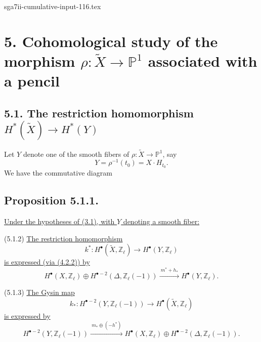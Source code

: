 \begin{filecontents*}{sga7ii-cumulative-input-116.tex}
\section*{5. Cohomological study of the morphism
$\rho:\widetilde X\longrightarrow\mathbb P^1$ associated with a pencil}

\subsection*{5.1. The restriction homomorphism
$H^*(\widetilde X)\longrightarrow H^*(Y)$}

Let $Y$ denote one of the smooth fibers of
$\rho:\widetilde X\to\mathbb P^1$, say
\[
Y=\rho^{-1}(t_0)=X\mathbin{\cdot}H_{t_0}.
\]
We have the commutative diagram
\begin{center}
\end{center}

\subsection*{Proposition 5.1.1.}
\underline{Under the hypotheses of (3.1), with $Y$ denoting a smooth
fiber:}

\smallskip
\noindent
\textup{(5.1.2)} \underline{The restriction homomorphism}
\[
k^*:H^\bullet(\widetilde X,\mathbb Z_\ell)
   \longrightarrow H^\bullet(Y,\mathbb Z_\ell)
\]
\underline{is expressed (via (4.2.2)) by}
\[
H^\bullet(X,\mathbb Z_\ell)\oplus
H^{\bullet-2}(\Delta,\mathbb Z_\ell(-1))
\xrightarrow{\ m^*+h_*\ }
H^\bullet(Y,\mathbb Z_\ell).
\]

\noindent
\textup{(5.1.3)} \underline{The Gysin map}
\[
k_*:H^{\bullet-2}(Y,\mathbb Z_\ell(-1))
   \longrightarrow H^\bullet(\widetilde X,\mathbb Z_\ell)
\]
\underline{is expressed by}
\[
H^{\bullet-2}(Y,\mathbb Z_\ell(-1))
\xrightarrow{\ m_*\oplus(-h^*)\ }
H^\bullet(X,\mathbb Z_\ell)\oplus
H^{\bullet-2}(\Delta,\mathbb Z_\ell(-1)).
\]


\end{filecontents*}
